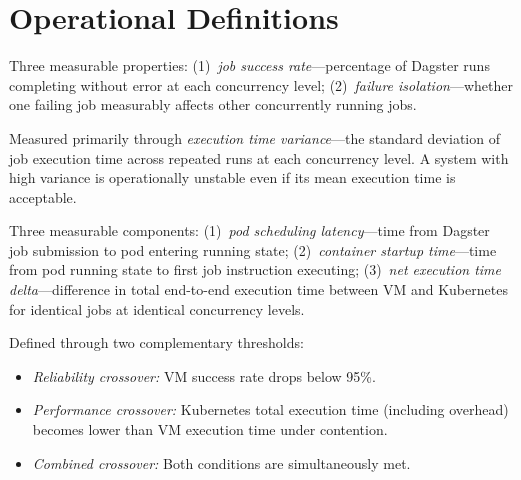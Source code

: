 
\section{Operational Definitions}
\label{sec:definitions}

\begin{description}[style=nextline]

  \item[Reliability]
  Three measurable properties:
  (1)~\emph{job success rate}---percentage of Dagster runs completing without error at each concurrency level;
  (2)~\emph{failure isolation}---whether one failing job measurably affects other concurrently running jobs.

  \item[System Stability]
  Measured primarily through \emph{execution time variance}---the standard deviation of job execution time across repeated runs at each concurrency level. A system with high variance is operationally unstable even if its mean execution time is acceptable.

  \item[Operational Overhead]
  Three measurable components:
  (1)~\emph{pod scheduling latency}---time from Dagster job submission to pod entering running state;
  (2)~\emph{container startup time}---time from pod running state to first job instruction executing;
  (3)~\emph{net execution time delta}---difference in total end-to-end execution time between VM and Kubernetes for identical jobs at identical concurrency levels.

  \item[Crossover Point]
  Defined through two complementary thresholds:
  \begin{itemize}
    \item \emph{Reliability crossover:} VM success rate drops below 95\%.
    \item \emph{Performance crossover:} Kubernetes total execution time (including overhead) becomes lower than VM execution time under contention.
    \item \emph{Combined crossover:} Both conditions are simultaneously met.
  \end{itemize}

\end{description}

